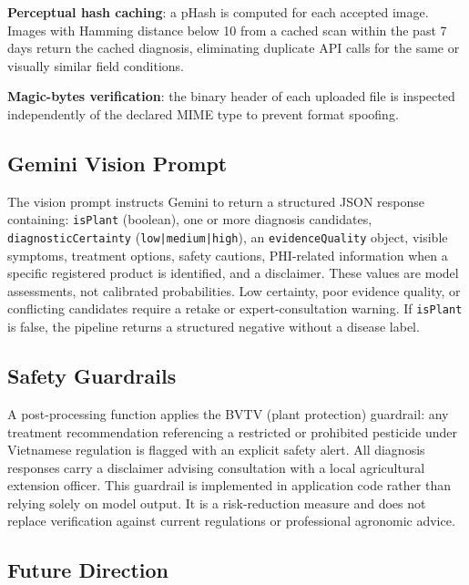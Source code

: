 \documentclass[conference]{IEEEtran}
\begin{document}
\textbf{Perceptual hash caching}: a pHash is computed for each accepted image. Images with Hamming distance below 10 from a cached scan within the past 7 days return the cached diagnosis, eliminating duplicate API calls for the same or visually similar field conditions.

\textbf{Magic-bytes verification}: the binary header of each uploaded file is inspected independently of the declared MIME type to prevent format spoofing.

\subsection{Gemini Vision Prompt}

The vision prompt instructs Gemini to return a structured JSON response containing: \texttt{isPlant} (boolean), one or more diagnosis candidates, \texttt{diagnosticCertainty} (\texttt{low|medium|high}), an \texttt{evidenceQuality} object, visible symptoms, treatment options, safety cautions, PHI-related information when a specific registered product is identified, and a disclaimer. These values are model assessments, not calibrated probabilities. Low certainty, poor evidence quality, or conflicting candidates require a retake or expert-consultation warning. If \texttt{isPlant} is false, the pipeline returns a structured negative without a disease label.

\subsection{Safety Guardrails}

A post-processing function applies the BVTV (plant protection) guardrail: any treatment recommendation referencing a restricted or prohibited pesticide under Vietnamese regulation is flagged with an explicit safety alert. All diagnosis responses carry a disclaimer advising consultation with a local agricultural extension officer. This guardrail is implemented in application code rather than relying solely on model output. It is a risk-reduction measure and does not replace verification against current regulations or professional agronomic advice.

\subsection{Future Direction}
\end{document}
